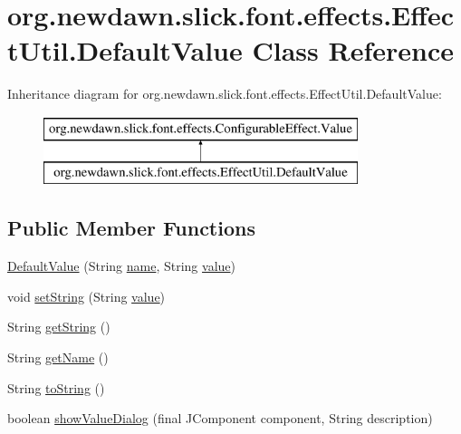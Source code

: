 \hypertarget{classorg_1_1newdawn_1_1slick_1_1font_1_1effects_1_1_effect_util_1_1_default_value}{}\section{org.\+newdawn.\+slick.\+font.\+effects.\+Effect\+Util.\+Default\+Value Class Reference}
\label{classorg_1_1newdawn_1_1slick_1_1font_1_1effects_1_1_effect_util_1_1_default_value}
Inheritance diagram for org.\+newdawn.\+slick.\+font.\+effects.\+Effect\+Util.\+Default\+Value\+:\begin{figure}[H]
\begin{center}
\leavevmode
\includegraphics[height=2.000000cm]{classorg_1_1newdawn_1_1slick_1_1font_1_1effects_1_1_effect_util_1_1_default_value}
\end{center}
\end{figure}
\subsection*{Public Member Functions}
\begin{DoxyCompactItemize}
\item 
\mbox{\hyperlink{classorg_1_1newdawn_1_1slick_1_1font_1_1effects_1_1_effect_util_1_1_default_value_a08456338c961a517bac78427f0f56f4c}{Default\+Value}} (String \mbox{\hyperlink{classorg_1_1newdawn_1_1slick_1_1font_1_1effects_1_1_effect_util_1_1_default_value_ae33082e2b5adea01e0d97dbf24d03170}{name}}, String \mbox{\hyperlink{classorg_1_1newdawn_1_1slick_1_1font_1_1effects_1_1_effect_util_1_1_default_value_a0bc4a9aca1a1dd586fe8580d9e68c8fd}{value}})
\item 
void \mbox{\hyperlink{classorg_1_1newdawn_1_1slick_1_1font_1_1effects_1_1_effect_util_1_1_default_value_af466ff9656f4b53ef10d130ba0b366a1}{set\+String}} (String \mbox{\hyperlink{classorg_1_1newdawn_1_1slick_1_1font_1_1effects_1_1_effect_util_1_1_default_value_a0bc4a9aca1a1dd586fe8580d9e68c8fd}{value}})
\item 
String \mbox{\hyperlink{classorg_1_1newdawn_1_1slick_1_1font_1_1effects_1_1_effect_util_1_1_default_value_ac957e1c14528cf85e62df2cbeaadf715}{get\+String}} ()
\item 
String \mbox{\hyperlink{classorg_1_1newdawn_1_1slick_1_1font_1_1effects_1_1_effect_util_1_1_default_value_a7f3743a892a785c75a420c87575d8670}{get\+Name}} ()
\item 
String \mbox{\hyperlink{classorg_1_1newdawn_1_1slick_1_1font_1_1effects_1_1_effect_util_1_1_default_value_aa08f994a5d2bcc8480dff8a5b7c57033}{to\+String}} ()
\item 
boolean \mbox{\hyperlink{classorg_1_1newdawn_1_1slick_1_1font_1_1effects_1_1_effect_util_1_1_default_value_a8f552a6acac2b51815b404750664b8d6}{show\+Value\+Dialog}} (final J\+Component component, String description)
\end{DoxyCompactItemize}

